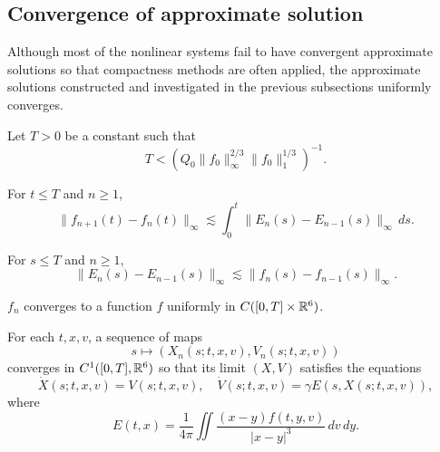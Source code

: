 \documentclass[12pt]{article}
\begin{document}
\subsection{Convergence of approximate solution}
Although most of the nonlinear systems fail to have convergent approximate solutions so that compactness methods are often applied, the approximate solutions constructed and investigated in the previous subsections uniformly converges.
\begin{lem}
Let $T>0$ be a constant such that
\[T<(Q_0\|f_0\|_\infty^{2/3}\|f_0\|_1^{1/3})^{-1}.\]
\begin{parts}
\item
For $t\le T$ and $n\ge1$,
\[\|f_{n+1}(t)-f_n(t)\|_\infty\lesssim\int_0^t\|E_n(s)-E_{n-1}(s)\|_\infty\,ds.\]
\item
For $s\le T$ and $n\ge1$,
\[\|E_n(s)-E_{n-1}(s)\|_\infty\lesssim\|f_n(s)-f_{n-1}(s)\|_\infty.\]
\item $f_n$ converges to a function $f$ uniformly in $C([0,T]\times\mathbb{R}^6)$.
\item For each $t,x,v$, a sequence of maps
\[s\mapsto(X_n(s;t,x,v),V_n(s;t,x,v))\]
converges in $C^1([0,T],\mathbb{R}^6)$ so that its limit $(X,V)$ satisfies the equations
\[\dot X(s;t,x,v)=V(s;t,x,v),\quad\dot V(s;t,x,v)=\gamma E(s,X(s;t,x,v)),\]
where
\[E(t,x)=\frac1{4\pi}\iint\frac{(x-y)f(t,y,v)}{|x-y|^3}\,dv\,dy.\]
\end{parts}
\end{lem}
\end{document}
